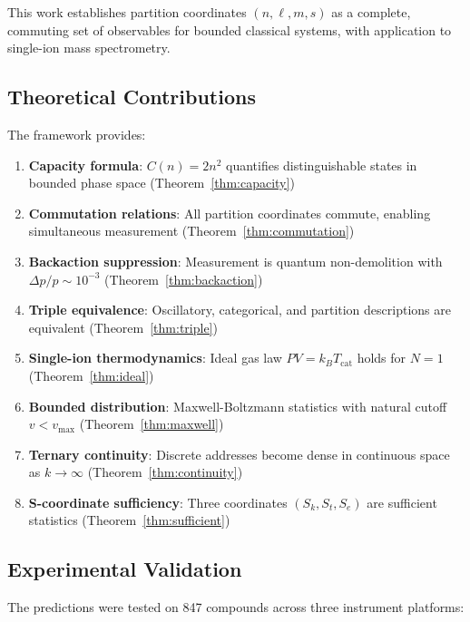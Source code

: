 \documentclass[twocolumn,10pt]{article}
\begin{document}
This work establishes partition coordinates $(n, \ell, m, s)$ as a complete, commuting set of observables for bounded classical systems, with application to single-ion mass spectrometry.

\subsection{Theoretical Contributions}

The framework provides:

\begin{enumerate}
    \item \textbf{Capacity formula}: $C(n) = 2n^2$ quantifies distinguishable states in bounded phase space (Theorem~\ref{thm:capacity})
    \item \textbf{Commutation relations}: All partition coordinates commute, enabling simultaneous measurement (Theorem~\ref{thm:commutation})
    \item \textbf{Backaction suppression}: Measurement is quantum non-demolition with $\Delta p/p \sim 10^{-3}$ (Theorem~\ref{thm:backaction})
    \item \textbf{Triple equivalence}: Oscillatory, categorical, and partition descriptions are equivalent (Theorem~\ref{thm:triple})
    \item \textbf{Single-ion thermodynamics}: Ideal gas law $PV = k_B T_{\mathrm{cat}}$ holds for $N=1$ (Theorem~\ref{thm:ideal})
    \item \textbf{Bounded distribution}: Maxwell-Boltzmann statistics with natural cutoff $v < v_{\max}$ (Theorem~\ref{thm:maxwell})
    \item \textbf{Ternary continuity}: Discrete addresses become dense in continuous space as $k \to \infty$ (Theorem~\ref{thm:continuity})
    \item \textbf{S-coordinate sufficiency}: Three coordinates $(S_k, S_t, S_e)$ are sufficient statistics (Theorem~\ref{thm:sufficient})
\end{enumerate}

\subsection{Experimental Validation}

The predictions were tested on 847 compounds across three instrument platforms:
\end{document}
